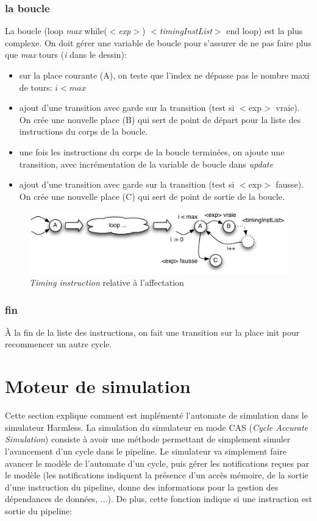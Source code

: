 \documentclass[11pt,a4paper]{article}
\begin{document}
\subsubsection{la boucle}

La boucle (loop \emph{max} while(\emph{$<$exp$>$}) \emph{$<$timingInstList$>$} end loop) est la plus complexe. On doit gérer une variable de boucle pour s'assurer de ne pas faire plus que \emph{max} tours (\emph{i} dans le dessin):
\begin{itemize}
\item sur la place courante (A), on teste que l'index ne dépasse pas le nombre maxi de tours: $i < max$
\item ajout d'une transition avec garde sur la transition (test si $<$exp$>$ vraie). On crée une nouvelle place (B) qui sert de point de départ pour la liste des instructions du corps de la boucle.
\item une fois les instructions du corps de la boucle terminées, on ajoute une transition, avec incrémentation de la variable de boucle dans \emph{update}
\item ajout d'une transition avec garde sur la transition (test si $<$exp$>$ fausse). On crée une nouvelle place (C) qui sert de point de sortie de la boucle.
\end{itemize}

\begin{figure}[htbp] %
   \centering
   \includegraphics[width=\linewidth]{automateLoop.pdf} 
   \caption{\emph{Timing instruction} relative à l'affectation}
   \label{fig:automateLoop}
\end{figure}

\subsubsection{fin}
À la fin de la liste des instructions, on fait une transition sur la place init pour recommencer un autre cycle.

\section{Moteur de simulation}
Cette section explique comment est implémenté l'automate de simulation dans le simulateur Harmless.
La simulation du simulateur en mode CAS (\emph{Cycle Accurate Simulation}) consiste à avoir une méthode permettant de simplement simuler l'avancement d'un cycle dans le pipeline. Le simulateur va simplement faire avancer le modèle de l'automate d'un cycle, puis gérer les notifications reçues par le modèle (les notifications indiquent la présence d'un accès mémoire, de la sortie d'une instruction du pipeline, donne des informations pour la gestion des dépendances de données, ...). De plus, cette fonction indique si une instruction est sortie du pipeline:
\end{document}
